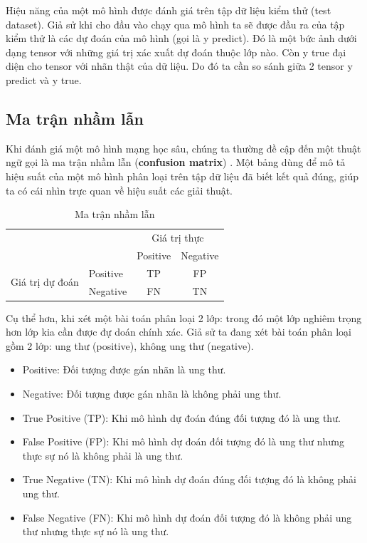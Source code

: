 Hiệu năng của một mô hình được đánh giá trên tập dữ liệu kiểm thử (test dataset). Giả sử khi cho đầu vào chạy qua mô hình ta sẽ được đầu ra của tập kiểm thử là các dự đoán của mô hình (gọi là y predict). Đó là một bức ảnh dưới dạng tensor với những giá trị xác xuất dự đoán thuộc lớp nào. Còn y true đại diện cho tensor với nhãn thật của dữ liệu. Do đó ta cần so sánh giữa 2 tensor y predict và y true.\par

\subsection{Ma trận nhầm lẫn}
Khi đánh giá một mô hình mạng học sâu, chúng ta thường đề cập đến một thuật ngữ gọi là ma trận nhầm lẫn (\textbf{confusion matrix}) \cite{confution}. Một bảng dùng để mô tả hiệu suất của một mô hình phân loại trên tập dữ liệu đã biết kết quả đúng, giúp ta có cái nhìn trực quan về hiệu suất các giải thuật.
\begin{table}[H]
\centering
\begin{tabular}{l|l|c|c|}
	\multicolumn{2}{c}{}	&	\multicolumn{2}{c}{Giá trị thực}	\\
	\cline{3-4}
	\multicolumn{2}{c|}{}					   & Positive &	Negative \\
	\cline{2-4}
	\multirow{2}{*}{Giá trị dự đoán}& Positive & TP 	  & FP 		 \\
	\cline{2-4}
									& Negative & FN		  & TN	 	 \\
	\cline{2-4}
\end{tabular}
\caption{Ma trận nhầm lẫn}
\label{confution_matrix}
\end{table}
\vspace{-5mm}
Cụ thể hơn, khi xét một bài toán phân loại 2 lớp: trong đó một lớp nghiêm trọng hơn lớp kia cần được đự doán chính xác. Giả sử ta đang xét bài toán phân loại gồm 2 lớp: ung thư (positive), không ung thư (negative).
\begin{itemize}[noitemsep, topsep=0pt]
	\item Positive: Đối tượng được gán nhãn là ung thư.
	\item Negative: Đối tượng được gán nhãn là không phải ung thư.
	\item True Positive (TP): Khi mô hình dự đoán đúng đối tượng đó là ung thư.
	\item False Positive (FP): Khi mô hình dự đoán đối tượng đó là ung thư nhưng thực sự nó là không phải là ung thư.
	\item True Negative (TN): Khi mô hình dự đoán đúng đối tượng đó là không phải ung thư.
	\item False Negative (FN): Khi mô hình dự đoán đối tượng đó là không phải ung thư nhưng thực sự nó là ung thư.
\end{itemize}

